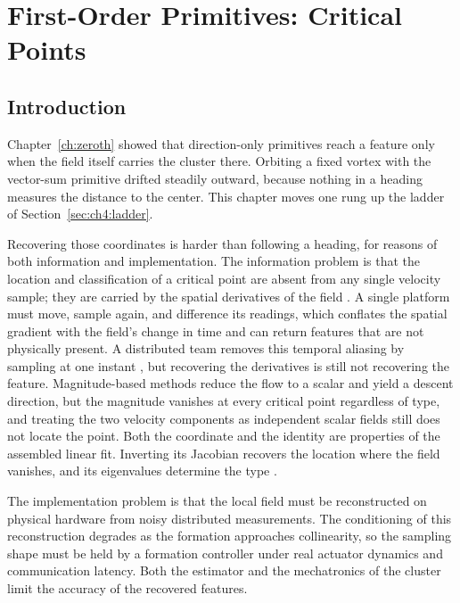\chapter{First-Order Primitives: Critical Points}
\label{ch:first_order}

\section{Introduction}
\label{sec:ch6:intro}

Chapter~\ref{ch:zeroth} showed that direction-only primitives reach a
feature only when the field itself carries the cluster there. Orbiting a
fixed vortex with the vector-sum primitive drifted steadily outward,
because nothing in a heading measures the distance to the center. This
chapter moves one rung up the ladder of Section~\ref{sec:ch4:ladder}.

Recovering those coordinates is harder than following a heading, for reasons of both information and implementation. The information problem is that the location and classification of a critical point are absent from any single velocity sample; they are carried by the spatial derivatives of the field \cite{55}. A single platform must move, sample again, and difference its readings, which conflates the spatial gradient with the field's change in time and can return features that are not physically present. A distributed team removes this temporal aliasing by sampling at one instant \cite{30,27,45}, but recovering the derivatives is still not recovering the feature. Magnitude-based methods \cite{26} reduce the flow to a scalar and yield a descent direction, but the magnitude vanishes at every critical point regardless of type, and treating the two velocity components as independent scalar fields still does not locate the point. Both the coordinate and the identity are properties of the assembled linear fit. Inverting its Jacobian recovers the location where the field vanishes, and its eigenvalues determine the type \cite{7}.

The implementation problem is that the local field must be reconstructed on physical hardware from noisy distributed measurements. The conditioning of this reconstruction degrades as the formation approaches collinearity, so the sampling shape must be held by a formation controller under real actuator dynamics and communication latency. Both the estimator and the mechatronics of the cluster limit the accuracy of the recovered features.

